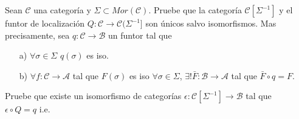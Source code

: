 \documentclass{article}
\begin{document}
	\begin{propsn}[\textbf{Ej. 13'}]
		Sean $\mathscr{C}$ una categoría y $\Sigma\subset Mor(\mathscr{C})$. Pruebe que la categoría $\mathscr{C}[\Sigma^{-1}]$ y el 
		funtor de localización $Q:\mathscr{C}\rightarrow \mathscr{C}(\Sigma^{-1}]$ son únicos salvo isomorfismos. Mas precisamente, sea $q:\mathscr{C}
		\rightarrow \mathscr{B}$ un funtor tal que 
		\begin{itemize}
			\item[a)] $\forall \sigma\in \Sigma$ \quad $q(\sigma)$ es iso.
			\item[b)] $\forall f:\mathscr{C}\to \mathscr{A}$ tal que $F(\sigma)$ es iso $\forall \sigma\in \Sigma$, $\exists ! \bar{F}:\mathscr{B}\to\mathscr{A}$
			tal que $\bar{F}\circ q=F$.\\
		\end{itemize}
		Pruebe que existe un isomorfismo de categorías $\epsilon:\mathscr{C}[\Sigma^{-1}]\to \mathscr{B}$ tal que \\$\epsilon\circ Q=q$ \quad i.e. \\
		\centerline{
		}
	\end{propsn}
\end{document}
